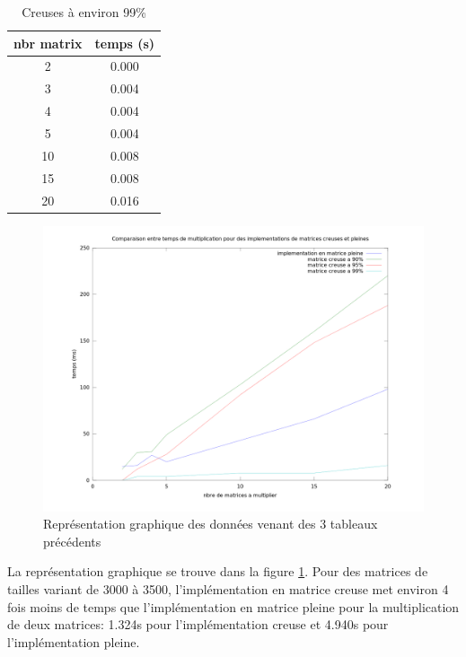 \documentclass[a4paper]{scrartcl}
\begin{document}
\begin{table}[H]
    \caption{Creuses à environ 99\%}
    \label{tab:}
    \begin{center}
        \begin{tabular}{cc}
            nbr matrix & temps (s)\\
            \hline
             2 &         0.000\\

    3 &           0.004\\

    4 &        0.004\\

    5 &       0.004\\

    10 &         0.008\\

    15 &         0.008 \\

    20 &         0.016\\

        \end{tabular}
    \end{center}
\end{table}
\begin{figure}[H]
    \begin{center}
        \includegraphics[width=\textwidth]{matrixgraph.png}
        \caption{Représentation graphique des données venant des 3 tableaux précédents}
        \label{fig:time}
    \end{center}
\end{figure}
La représentation graphique se trouve dans la figure \ref{fig:time}.
Pour des matrices de tailles variant de 3000 à 3500,  l'implémentation en matrice creuse met environ 4 fois moins de temps que l'implémentation en matrice pleine pour la multiplication de deux matrices: 1.324s pour l'implémentation creuse et 4.940s pour l'implémentation pleine.
\end{document}
